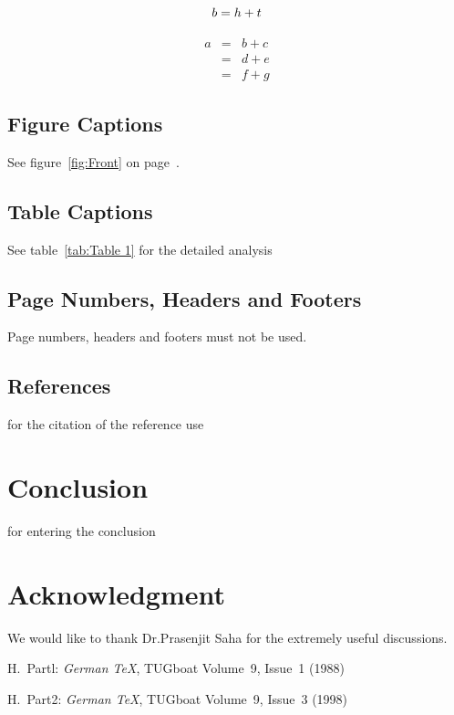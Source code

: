 \documentclass[10pt,letterpaper]{ltugboat}
\begin{document}
\begin{equation}
 b = h + t\\
\end{equation}

\begin{eqnarray}
a & = & b + c \\
& = & d + e \\
& = & f + g
\end{eqnarray}

\subsection{Figure Captions}

See figure~\ref{fig:Front} on page~\pageref{fig:Front}.

\subsection{Table Captions}

See table~\ref{tab:Table 1} for the detailed analysis

\subsection{Page Numbers, Headers and Footers}

Page numbers, headers and footers must not be used.

\subsection{References}
for the citation of the reference use \cite{ref2}

\section{Conclusion}

for entering the conclusion

\section*{Acknowledgment}
We would like to thank Dr.Prasenjit Saha for the extremely useful discussions.

\begin{thebibliography}{99}
 H.~Partl:
\emph{German \TeX},
TUGboat Volume~9, Issue~1 (1988)

 H.~Part2:
\emph{German \TeX},
TUGboat Volume~9, Issue~3 (1998)

\end{thebibliography}
\end{document}
